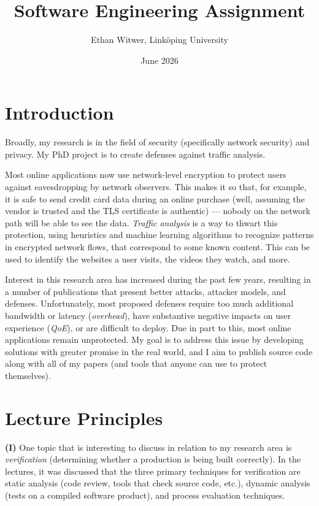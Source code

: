 \documentclass[11pt]{article}
\title{Software Engineering Assignment}
\author{Ethan Witwer, Link{\"o}ping University}
\date{June 2026}
\begin{document}
\maketitle

\section{Introduction}

Broadly, my research is in the field of security (specifically network security) and privacy. My PhD project is to create defenses against traffic analysis.

Most online applications now use network-level encryption to protect users against eavesdropping by network observers. This makes it so that, for example, it is safe to send credit card data during an online purchase (well, assuming the vendor is trusted and the TLS certificate is authentic) --- nobody on the network path will be able to see the data. \textit{Traffic analysis} is a way to thwart this protection, using heuristics and machine learning algorithms to recognize patterns in encrypted network flows, that correspond to some known content. This can be used to identify the websites a user visits, the videos they watch, and more.

Interest in this research area has increased during the past few years, resulting in a number of publications that present better attacks, attacker models, and defenses. Unfortunately, most proposed defenses require too much additional bandwidth or latency (\textit{overhead}), have substantive negative impacts on user experience (\textit{QoE}), or are difficult to deploy. Due in part to this, most online applications remain unprotected. My goal is to address this issue by developing solutions with greater promise in the real world, and I aim to publish source code along with all of my papers (and tools that anyone can use to protect themselves).



\section{Lecture Principles}

\textbf{(I)} One topic that is interesting to discuss in relation to my research area is \textit{verification} (determining whether a production is being built correctly). In the lectures, it was discussed that the three primary techniques for verification are static analysis (code review, tools that check source code, etc.), dynamic analysis (tests on a compiled software product), and process evaluation techniques.
\end{document}
